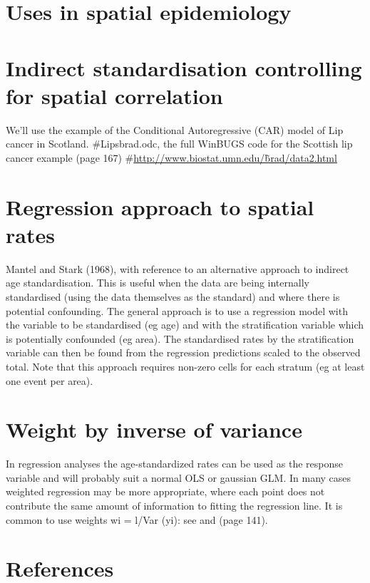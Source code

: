 \documentclass[a4paper]{article}
\begin{document}
\section{Uses in spatial epidemiology}
\label{sec-12}
\section{Indirect standardisation controlling for spatial correlation}
\label{sec-13}

We'll use the example of the Conditional Autoregressive (CAR) model of Lip cancer in Scotland.
\#Lipsbrad.odc, the full WinBUGS code for the Scottish lip cancer example (page 167) 
\#\href{http://www.biostat.umn.edu/~brad/data2.html}{http://www.biostat.umn.edu/\~brad/data2.html}
\section{Regression approach to spatial rates}
\label{sec-14}

Mantel and Stark (1968), with reference to an alternative approach to indirect age standardisation. This is useful when the data are being internally standardised (using the data themselves as the standard) 
and where there is potential confounding. The general approach is to use a regression model with the variable to be standardised (eg age) and with the stratification variable which is potentially confounded (eg area). 
The standardised rates by the stratification variable can then be found from the regression predictions scaled to the observed total. Note that this approach requires non-zero cells for each stratum (eg at least one event per area).
\section{Weight by inverse of variance}
\label{sec-15}

In regression analyses the age-standardized rates can be used as the response variable and will probably suit a normal OLS or gaussian GLM.  In many cases weighted regression may be more appropriate, where each point does not contribute the same amount of information to fitting the regression line. It is common to use weights wi = l/Var (yi): see \cite{Armitage} and
\cite{Boyle} (page 141).
\section{References}
\label{sec-16}



\end{document}
